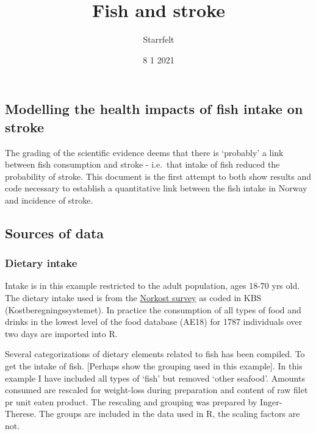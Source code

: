 \documentclass[
]{article}
\title{Fish and stroke}
\author{Starrfelt}
\date{8 1 2021}
\begin{document}
\maketitle

\hypertarget{modelling-the-health-impacts-of-fish-intake-on-stroke}{%
\subsection{Modelling the health impacts of fish intake on
stroke}\label{modelling-the-health-impacts-of-fish-intake-on-stroke}}

The grading of the scientific evidence deems that there is `probably' a
link between fish consumption and stroke - i.e.~that intake of fish
reduced the probability of stroke. This document is the first attempt to
both show results and code necessary to establish a quantitative link
between the fish intake in Norway and incidence of stroke.

\hypertarget{sources-of-data}{%
\subsection{Sources of data}\label{sources-of-data}}

\hypertarget{dietary-intake}{%
\subsubsection{Dietary intake}\label{dietary-intake}}

Intake is in this example restricted to the adult population, ages 18-70
yrs old. The dietary intake used is from the
\href{https://www.helsedirektoratet.no/rapporter/norkost-3-en-landsomfattende-kostholdsundersokelse-blant-menn-og-kvinner-i-norge-i-alderen-18-70-ar-2010-11/Norkost\%203\%20en\%20landsomfattende\%20kostholdsundersokelse\%20blant\%20menn\%20og\%20kvinner\%20i\%20Norge\%20i\%20alderen-18-70\%20\%C3\%A5r\%202010-11.pdf/_/attachment/inline/b7bafaab-6059-4450-8d76-c3ed9f3eaf3f:be251cd1153cf1ae8e4c46eedddc13b36da3d11d/Norkost\%203\%20en\%20landsomfattende\%20kostholdsundersokelse\%20blant\%20menn\%20og\%20kvinner\%20i\%20Norge\%20i\%20alderen-18-70\%20\%C3\%A5r\%202010-11.pdf}{Norkost
survey} as coded in KBS (Kostberegningssystemet). In practice the
consumption of all types of food and drinks in the lowest level of the
food database (AE18) for 1787 individuals over two days are imported
into R.

Several categorizations of dietary elements related to fish has been
compiled. To get the intake of fish. {[}Perhaps show the grouping used
in this example{]}. In this example I have included all types of `fish'
but removed `other seafood'. Amounts consumed are rescaled for
weight-loss during preparation and content of raw filet pr unit eaten
product. The rescaling and grouping was prepared by Inger-Therese. The
groups are included in the data used in R, the scaling factors are not.
\end{document}
